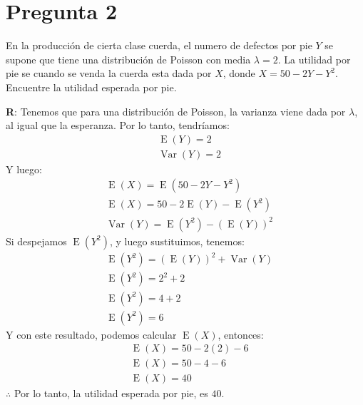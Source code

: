 
\section*{Pregunta 2}

En la producción de cierta clase cuerda, el numero de defectos por pie $Y$ se supone que tiene una distribución de Poisson con media $\lambda = 2$. La utilidad por pie se cuando se venda la cuerda esta dada por $X$, donde $X = 50 - 2Y - Y^2$. Encuentre la utilidad esperada por pie.

\vspace{0.3cm}
\textbf{R}: Tenemos que para una distribución de Poisson, la varianza viene dada por $\lambda$, al igual que la esperanza. Por lo tanto, tendríamos:
\begin{align*}
	& \operatorname{E}(Y) = 2 \\
	& \operatorname{Var}(Y) = 2
\end{align*}
Y luego:
\begin{align*}
	& \operatorname{E}(X) = \operatorname{E}(50 - 2Y - Y^2) \\
	& \operatorname{E}(X) = 50 - 2\operatorname{E}(Y) - \operatorname{E}(Y^2) \\
	& \operatorname{Var}(Y) = \operatorname{E}(Y^2) - (\operatorname{E}(Y))^2
\end{align*}
Si despejamos $\operatorname{E}(Y^2)$, y luego sustituimos, tenemos:
\begin{align*}
	& \operatorname{E}(Y^2) = (\operatorname{E}(Y))^2 + \operatorname{Var}(Y) \\
	& \operatorname{E}(Y^2) = 2^2 + 2 \\
	& \operatorname{E}(Y^2) = 4 + 2 \\
	& \operatorname{E}(Y^2) = 6
\end{align*}
Y con este resultado, podemos calcular $\operatorname{E}(X)$, entonces:
\begin{align*}
	& \operatorname{E}(X) = 50 - 2(2) - 6 \\
	& \operatorname{E}(X) = 50 - 4 - 6 \\
	& \operatorname{E}(X) = 40
\end{align*}
$\therefore$ Por lo tanto, la utilidad esperada por pie, es $40$.